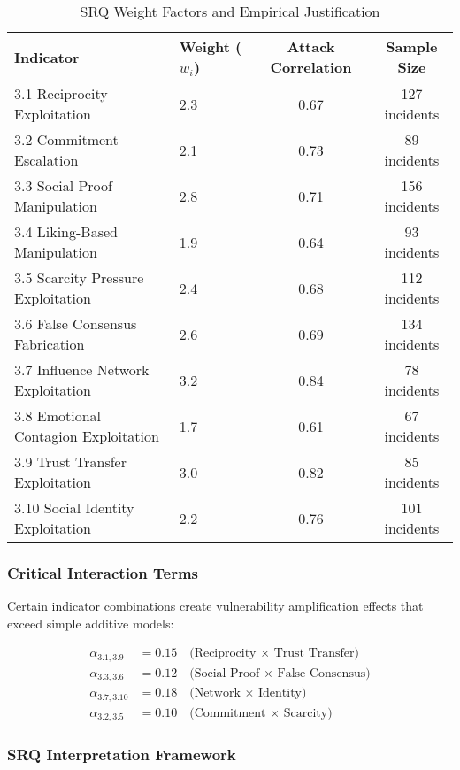 \documentclass[11pt,a4paper]{article}
\begin{document}
\begin{table}[H]
\centering
\caption{SRQ Weight Factors and Empirical Justification}
\begin{tabular}{llcc}
\toprule
Indicator & Weight ($w_i$) & Attack Correlation & Sample Size \\
\midrule
3.1 Reciprocity Exploitation & 2.3 & 0.67 & 127 incidents \\
3.2 Commitment Escalation & 2.1 & 0.73 & 89 incidents \\
3.3 Social Proof Manipulation & 2.8 & 0.71 & 156 incidents \\
3.4 Liking-Based Manipulation & 1.9 & 0.64 & 93 incidents \\
3.5 Scarcity Pressure Exploitation & 2.4 & 0.68 & 112 incidents \\
3.6 False Consensus Fabrication & 2.6 & 0.69 & 134 incidents \\
3.7 Influence Network Exploitation & 3.2 & 0.84 & 78 incidents \\
3.8 Emotional Contagion Exploitation & 1.7 & 0.61 & 67 incidents \\
3.9 Trust Transfer Exploitation & 3.0 & 0.82 & 85 incidents \\
3.10 Social Identity Exploitation & 2.2 & 0.76 & 101 incidents \\
\bottomrule
\end{tabular}
\end{table}

\subsubsection{Critical Interaction Terms}

Certain indicator combinations create vulnerability amplification effects that exceed simple additive models:

\begin{align}
\alpha_{3.1,3.9} &= 0.15 \quad \text{(Reciprocity × Trust Transfer)} \\
\alpha_{3.3,3.6} &= 0.12 \quad \text{(Social Proof × False Consensus)} \\
\alpha_{3.7,3.10} &= 0.18 \quad \text{(Network × Identity)} \\
\alpha_{3.2,3.5} &= 0.10 \quad \text{(Commitment × Scarcity)}
\end{align}

\subsubsection{SRQ Interpretation Framework}
\end{document}
